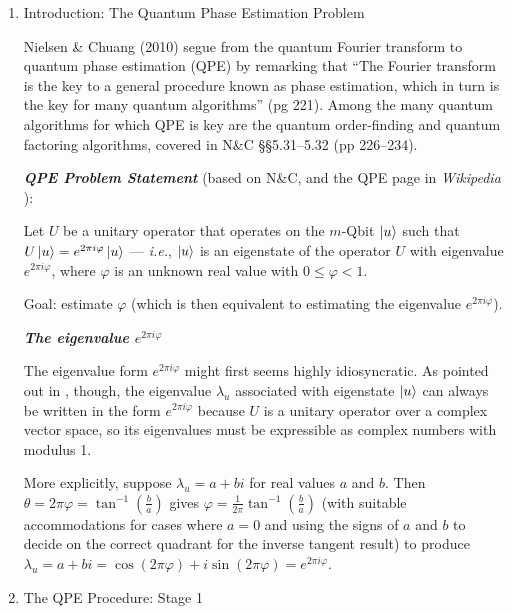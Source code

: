 \documentclass{article}
\begin{document}
\begin{enumerate}[label=\textbf{(\arabic*)}]

\item Introduction: The Quantum Phase Estimation Problem

Nielsen \& Chuang (2010) segue from the quantum Fourier transform to quantum phase estimation (QPE) by remarking that ``The Fourier transform is the key to a general procedure known as phase estimation, which in turn is the key for many quantum algorithms'' (pg 221). Among the many quantum algorithms for which QPE is key are the quantum order-finding and quantum factoring algorithms, covered in N\&C \S\S 5.31--5.32 (pp 226--234).

\textbf{\textit{QPE Problem Statement}} (based on N\&C, and the QPE page in \textit{Wikipedia} \cite{wikipedia:qpe}):

\begin{adjustwidth}{0.5in}{0.5in}
Let $U$ be a unitary operator that operates on the $m$-Qbit $\ket{u}$ such that $U\ket{u} = e^{2\pi i \varphi}\ket{u}$ --- \textit{i.e.}, $\ket{u}$ is an eigenstate of the operator $U$ with eigenvalue $e^{2\pi i \varphi}$, where $\varphi$ is an unknown real value with $0\le\varphi<1$.

Goal: estimate $\varphi$ (which is then equivalent to estimating the eigenvalue $e^{2\pi i \varphi}$).
\end{adjustwidth}

\textbf{\textit{The eigenvalue $e^{2\pi i \varphi}$}}

The eigenvalue form $e^{2\pi i \varphi}$ might first seems highly idiosyncratic. As pointed out in \cite{wikipedia:qpe}, though, the eigenvalue $\lambda_u$ associated with eigenstate $\ket{u}$ can always be written in the form $e^{2\pi i \varphi}$ because $U$ is a unitary operator over a complex vector space, so its eigenvalues must be expressible as complex numbers with modulus 1.

More explicitly, suppose $\lambda_{u} = a + bi$ for real values $a$ and $b$. Then $\theta = 2\pi\varphi = \tan^{-1}(\frac{b}{a})$ gives $\varphi = \frac{1}{2\pi}\tan^{-1}(\frac{b}{a})$ (with suitable accommodations for cases where $a=0$ and using the signs of $a$ and $b$ to decide on the correct quadrant for the inverse tangent result) to produce $\lambda_{u} = a + bi = \cos(2\pi\varphi) + i\sin(2\pi\varphi) = e^{2\pi i \varphi}$.

\item The QPE Procedure: Stage 1


\end{enumerate}
\end{document}
